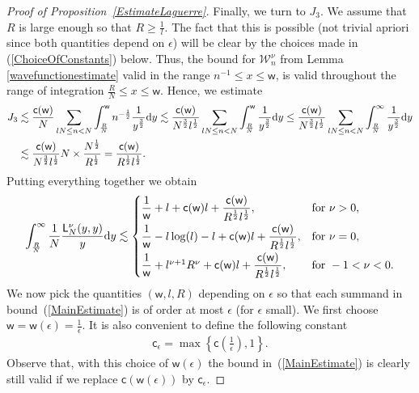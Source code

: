 \begin{proof}[Proof of Proposition~\ref{EstimateLaguerre}]
Finally, we turn to $J_3$. We assume that $R$ is large enough so that $R \ge \frac{1}{l}$. The fact that this is possible (not trivial apriori since both quantities depend on $\epsilon$) will be clear by the choices made in (\ref{ChoiceOfConstants}) below. Thus, the bound for $\mathcal{W}_n^{\nu}$ from Lemma \ref{wavefunctionestimate} valid in the range $n^{-1}\le x \le \mathsf{w}$, is valid throughout the range of integration $\frac{R}{N} \le x \le \mathsf{w}$. Hence, we estimate
\begin{align*}
J_3 &\lesssim \frac{\mathsf{c}(\mathsf{w})}{N} \sum_{lN \le n < N}^{}\int_{\frac{R}{N}}^{\mathsf{w}}n^{-\frac{1}{2}}\frac{1}{y^{\frac{3}{2}}}{\rm d}y\lesssim \frac{\mathsf{c}(\mathsf{w})}{N^{\frac{3}{2}}l^{\frac{1}{2}}} \sum_{lN \le n < N}^{}\int_{\frac{R}{N}}^{\mathsf{w}}\frac{1}{y^{\frac{3}{2}}}{\rm d}y\le \frac{\mathsf{c}(\mathsf{w})}{N^{\frac{3}{2}}l^{\frac{1}{2}}} \sum_{lN \le n < N}^{}\int_{\frac{R}{N}}^{\infty}\frac{1}{y^{\frac{3}{2}}}{\rm d}y \nonumber\\
&\lesssim \frac{\mathsf{c}(\mathsf{w})}{N^{\frac{3}{2}}l^{\frac{1}{2}}} N \times \frac{N^{\frac{1}{2}}}{R^{\frac{1}{2}}}=\frac{\mathsf{c}(\mathsf{w})}{R^{\frac{1}{2}}l^{\frac{1}{2}}}.
\end{align*}
Putting everything together we obtain
\begin{gather}\label{MainEstimate}
\int_{\frac{R}{N}}^{\infty}\frac{1}{N}\frac{\mathsf{L}_N^{\nu}(y,y)}{y}{\rm d}y \lesssim \begin{cases}
\dfrac{1}{\mathsf{w}}+l+\mathsf{c}(\mathsf{w})l+\dfrac{\mathsf{c}(\mathsf{w})}{R^{\frac{1}{2}}l^{\frac{1}{2}}}, &\text{for } \nu>0,\vspace{1mm}\\
\dfrac{1}{\mathsf{w}}-l\log(l)-l+\mathsf{c}(\mathsf{w})l+\dfrac{\mathsf{c}(\mathsf{w})}{R^{\frac{1}{2}}l^{\frac{1}{2}}}, &\text{for } \nu=0,\vspace{1mm}\\
\dfrac{1}{\mathsf{w}}+l^{\nu+1}R^{\nu}+\mathsf{c}(\mathsf{w})l+\dfrac{\mathsf{c}(\mathsf{w})}{R^{\frac{1}{2}}l^{\frac{1}{2}}}, &\text{for } -1<\nu<0.
\end{cases}
\end{gather}
We now pick the quantities $(\mathsf{w},l,R)$ depending on $\epsilon$ so that each summand in bound~(\ref{MainEstimate}) is of order at most $\epsilon$ (for $\epsilon$ small). We first choose $\mathsf{w}=\mathsf{w}(\epsilon)=\frac{1}{\epsilon}$. It is also convenient to define the following constant
 \begin{gather*}
\mathsf{c}_{\epsilon}=\max \left\{\mathsf{c}\left(\frac{1}{\epsilon}\right),1 \right\}.
 \end{gather*}
Observe that, with this choice of $\mathsf{w}(\epsilon)$ the bound in~(\ref{MainEstimate}) is clearly still valid if we replace $\mathsf{c}(\mathsf{w}(\epsilon))$ by $\mathsf{c}_{\epsilon}$.


\end{proof}
